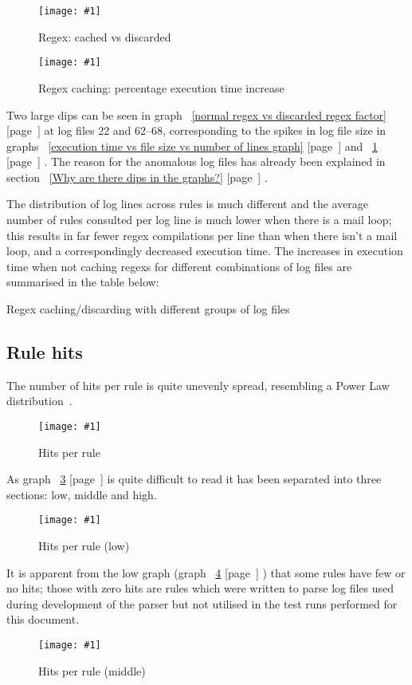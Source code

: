 \documentclass[a4paper,12pt,draft]{article}
\newcommand{\showgraph}[3]{
    \begin{figure}[hbt!]
        \caption{#2}\label{#3}
        \texttt{[image: \#1]}
    \end{figure}
}
\newcommand{\showtable}[3]{
    \begin{table}[ht]
        \caption{#2}\label{#3}
        
    \end{table}
}
\newcommand{\refwithpage}[1]{%
    \empty{}\ref{#1} [page~\pageref{#1}]%
}
\begin{document}
\showgraph{build/plot-cached-discarded.ps}{Regex: cached vs
discarded}{normal regex vs discard regex}

\showgraph{build/plot-cached-discarded-factor.ps}{Regex caching: percentage
execution time increase}{normal regex vs discarded regex factor}

Two large dips can be seen in graph~\refwithpage{normal regex vs discarded
regex factor} at log files 22 and 62--68, corresponding to the spikes in
log file size in graphs~\refwithpage{execution time vs file size vs number
of lines graph} and~\refwithpage{normal regex vs discard regex}.  The
reason for the anomalous log files has already been explained in
section~\refwithpage{Why are there dips in the graphs?}.

The distribution of log lines across rules is much different and the
average number of rules consulted per log line is much lower when there is
a mail loop; this results in far fewer regex compilations per line than
when there isn't a mail loop, and a correspondingly decreased execution
time.  The increases in execution time when not caching regexs for
different combinations of log files are summarised in the table below:

\showtable{build/stats-cached-discarded-include-for-graph}
{Regex caching/discarding with different groups of log files}
{Regex caching/discarding with different groups of log files}


\subsection{Rule hits}
\label{rule hits}

The number of hits per rule is quite unevenly spread, resembling a Power
Law distribution~\cite{powerlaw}.

\showgraph{build/plot-hits.ps}{Hits per rule}{rule hits graph}

As graph~\refwithpage{rule hits graph} is quite difficult to read it has
been separated into three sections: low, middle and high.

\showgraph{build/plot-hits-low.ps}{Hits per rule (low)}{hits per rule low}

It is apparent from the low graph (graph~\refwithpage{hits per rule low})
that some rules have few or no hits; those with zero hits are rules which
were written to parse log files used during development of the parser but
not utilised in the test runs performed for this document.

\showgraph{build/plot-hits-middle.ps}{Hits per rule (middle)}{hits per rule
middle}
\end{document}

